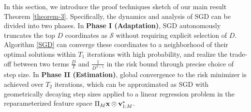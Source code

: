 In this section, we introduce the proof techniques sketch of our main result Theorem \ref{theorem-3}. Specifically, the dynamics and analysis of SGD can be divided into two phases. In \textbf{Phase I (Adaptation)}, SGD autonomously truncates the top $D$ coordinates as $\mathcal{S}$ without requiring explicit selection of $D$. Algorithm \ref{SGD} can converge these coordinates to a neighborhood of their optimal solutions within $T_1$ iterations with high probability, and realize the trade-off between two terms $\frac{D}{T}$ and $\frac{1}{D^{\beta -1}}$ in the risk bound through precise choice of step size. 
In \textbf{Phase II (Estimation)}, global convergence to the risk minimizer is achieved over $T_2$ iterations, which can be approximated as SGD with geometrically decaying step sizes applied to a linear regression problem in the reparameterized feature space $\Pi_M\mathbf{x}\odot\mathbf{v}_{1:M}^*$. %


